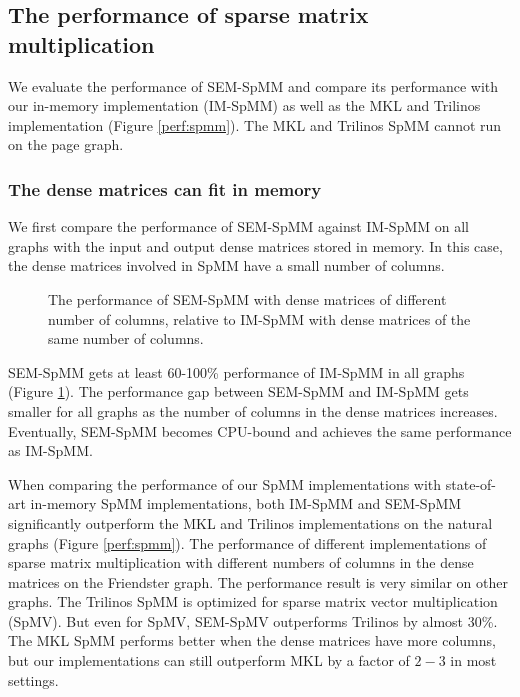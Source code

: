\subsection{The performance of sparse matrix multiplication}

We evaluate the performance of SEM-SpMM and compare its performance with
our in-memory implementation (IM-SpMM) as well as the MKL and Trilinos
implementation (Figure \ref{perf:spmm}). The MKL and Trilinos SpMM cannot run
on the page graph.

\subsubsection{The dense matrices can fit in memory}

We first compare the performance of SEM-SpMM against IM-SpMM on all graphs with
the input and output dense matrices stored in memory. In this case, the dense
matrices involved in SpMM have a small number of columns.

\begin{figure}
	\begin{center}
		\footnotesize
		
		\caption{The performance of SEM-SpMM with dense matrices of different
			number of columns, relative to IM-SpMM with dense matrices of
		the same number of columns.}
		\label{perf:spmm_comp}
	\end{center}
\end{figure}

%		

SEM-SpMM gets at least 60-100\% performance of IM-SpMM in all graphs (Figure
\ref{perf:spmm_comp}). The performance gap between SEM-SpMM and IM-SpMM gets
smaller for all graphs as the number of columns in the dense matrices increases.
Eventually, SEM-SpMM becomes CPU-bound and achieves the same performance as
IM-SpMM.

When comparing the performance of our SpMM implementations with state-of-art
in-memory SpMM implementations, both IM-SpMM and SEM-SpMM significantly
outperform the MKL and Trilinos implementations on the natural graphs (Figure
\ref{perf:spmm}). The performance of different implementations
of sparse matrix multiplication with different numbers of columns in the dense
matrices on the Friendster graph. The performance result is very similar
on other graphs. The Trilinos SpMM is optimized for sparse matrix vector
multiplication (SpMV). But even for SpMV, SEM-SpMV outperforms Trilinos by
almost 30\%. The MKL SpMM performs better when the dense matrices have more columns,
but our implementations can still outperform MKL by a factor of $2-3$ in most
settings.


